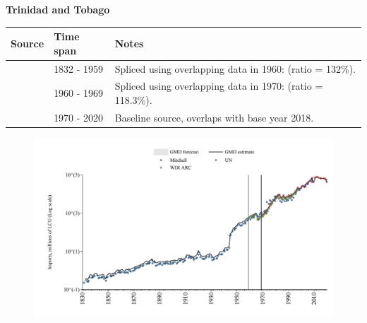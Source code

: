 \documentclass[12pt,a4paper,landscape]{article}
\begin{document}
\begin{adjustbox}{max totalsize={\paperwidth}{\paperheight},center}
\begin{minipage}[t][\textheight][t]{\textwidth}
\vspace*{0.5cm}
{}
\begin{center}
{\Large\bfseries Trinidad and Tobago}
\end{center}
\vspace{0.5cm}
\begin{table}[H]
\centering
\small
\begin{tabular}{|l|l|l|}
\hline
\textbf{Source} & \textbf{Time span} & \textbf{Notes} \\
\hline
\rowcolor{white}\cite{Mitchell}& 1832 - 1959 &Spliced using overlapping data in 1960: (ratio = 132\%).\\
\rowcolor{lightgray}\cite{WDI_ARC}& 1960 - 1969 &Spliced using overlapping data in 1970: (ratio = 118.3\%).\\
\rowcolor{white}\cite{UN}& 1970 - 2020 &Baseline source, overlaps with base year 2018.\\
\hline
\end{tabular}
\end{table}
\begin{figure}[H]
\centering
\includegraphics[width=\textwidth,height=0.6\textheight,keepaspectratio]{graphs/TTO_imports.pdf}
\end{figure}
\end{minipage}
\end{adjustbox}
\end{document}
